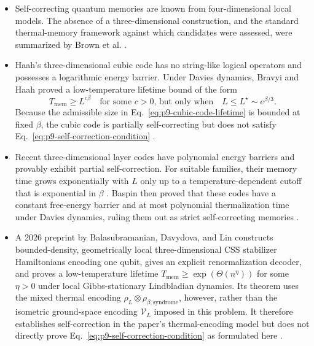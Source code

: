 \begin{itemize}
  \item Self-correcting quantum memories are known from four-dimensional
  local models.  The absence of a three-dimensional construction, and the
  standard thermal-memory framework against which candidates were assessed,
  were summarized by Brown et al.
  .

  \item Haah's three-dimensional cubic code has no string-like logical
  operators and possesses a logarithmic energy barrier.  Under Davies
  dynamics, Bravyi and Haah proved a low-temperature lifetime bound of the
  form
  \begin{equation}
    T_{\mathrm{mem}}\ge L^{c\beta}
    \quad\text{for some $c>0$, but only when}\quad
    L\le L^\star\sim e^{\beta/3}.
    \label{eq:p9-cubic-code-lifetime}
  \end{equation}
  Because the admissible size in Eq.~\eqref{eq:p9-cubic-code-lifetime} is
  bounded at fixed $\beta$, the cubic code is partially self-correcting but
  does not satisfy Eq.~\eqref{eq:p9-self-correction-condition}
  .

  \item Recent three-dimensional layer codes have polynomial energy barriers
  and provably exhibit partial self-correction.  For suitable families, their
  memory time grows exponentially with $L$ only up to a temperature-dependent
  cutoff that is exponential in $\beta$
  .  Baspin then proved that these codes
  have a constant free-energy barrier and at most polynomial thermalization
  time under Davies dynamics, ruling them out as strict self-correcting
  memories .

  \item A 2026 preprint by Balasubramanian, Davydova, and Lin constructs
  bounded-density, geometrically local three-dimensional CSS stabilizer
  Hamiltonians encoding one qubit, gives an explicit renormalization decoder,
  and proves a low-temperature lifetime
  $T_{\mathrm{mem}}\ge\exp(\Theta(n^\eta))$ for some $\eta>0$ under local
  Gibbs-stationary Lindbladian dynamics.  Its theorem uses the mixed thermal
  encoding $\rho_L\otimes\rho_{\beta,\mathrm{syndrome}}$, however, rather than
  the isometric ground-space encoding $\mathcal V_L$ imposed in this problem.
  It therefore establishes self-correction in the paper's thermal-encoding
  model but does not directly prove
  Eq.~\eqref{eq:p9-self-correction-condition} as formulated here
  .
\end{itemize}

